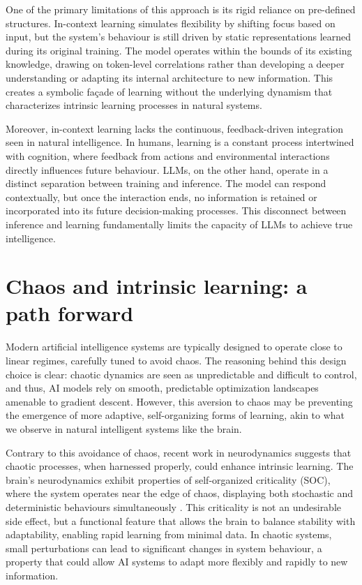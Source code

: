 \documentclass{article}
\begin{document}
One of the primary limitations of this approach is its rigid reliance
on pre-defined structures. In-context learning simulates flexibility
by shifting focus based on input, but the system's behaviour is still
driven by static representations learned during its original training. The
model operates within the bounds of its existing knowledge, drawing on
token-level correlations rather than developing a deeper understanding
or adapting its internal architecture to new information. This creates
a symbolic façade of learning without the underlying dynamism that
characterizes intrinsic learning processes in natural systems.

Moreover, in-context learning lacks the continuous, feedback-driven
integration seen in natural intelligence. In humans, learning is a
constant process intertwined with cognition, where feedback from actions
and environmental interactions directly influences future behaviour. LLMs,
on the other hand, operate in a distinct separation between training and
inference. The model can respond contextually, but once the interaction
ends, no information is retained or incorporated into its future
decision-making processes. This disconnect between inference and learning
fundamentally limits the capacity of LLMs to achieve true intelligence.


\section{Chaos and intrinsic learning: a path forward}

Modern artificial intelligence systems are typically designed to
operate close to linear regimes, carefully tuned to avoid chaos. The
reasoning behind this design choice is clear: chaotic dynamics are seen
as unpredictable and difficult to control, and thus, AI models rely
on smooth, predictable optimization landscapes amenable to
gradient descent. However, this aversion to chaos may be preventing the
emergence of more adaptive, self-organizing forms of learning, akin to
what we observe in natural intelligent systems like the brain.

Contrary to this avoidance of chaos, recent work in neurodynamics suggests
that chaotic processes, when harnessed properly, could enhance intrinsic
learning. The brain's neurodynamics exhibit properties of self-organized
criticality (SOC), where the system operates near the edge of chaos,
displaying both stochastic and deterministic behaviours simultaneously
\cite{Habibollahi2023,ovchinnikov2021,Ovchinnikov_2016}. This criticality
is not an undesirable side effect, but a functional feature that allows
the brain to balance stability with adaptability, enabling rapid learning
from minimal data. In chaotic systems, small perturbations can lead to
significant changes in system behaviour, a property that could allow AI
systems to adapt more flexibly and rapidly to new information.
\end{document}
